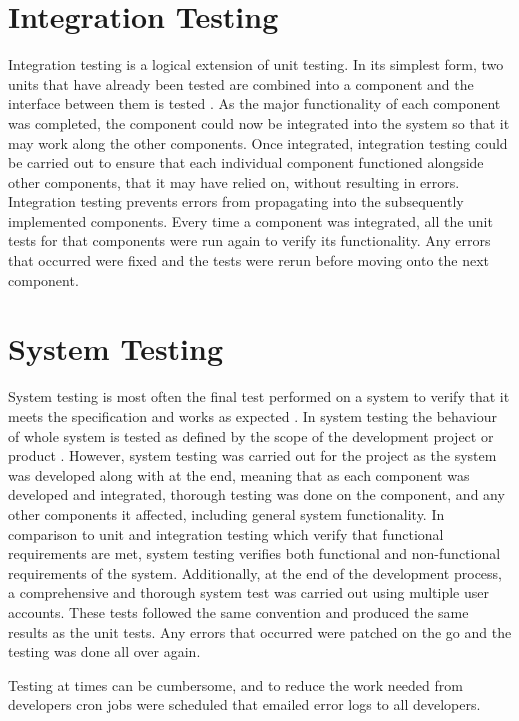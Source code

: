 \section{Integration Testing}
Integration testing is a logical extension of unit testing. In its simplest form, two units that have already been tested are combined into a component and the interface between them is tested \cite{MSDN:IntegrationTesting}. As the major functionality of each component was completed, the component could now be integrated into the system so that it may work along the other components. Once integrated, integration testing could be carried out to ensure that each individual component functioned alongside other components, that it may have relied on, without resulting in errors. Integration testing prevents errors from propagating into the subsequently implemented components. Every time a component was integrated, all the unit tests for that components were run again to verify its functionality. Any errors that occurred were fixed and the tests were rerun before moving onto the next component.

\section{System Testing}
System testing is most often the final test performed on a system to verify that it meets the specification and works as expected \cite{ISTQB:SystemTesting}. In system testing the behaviour of whole system is tested as defined by the scope of the development project or product \cite{ISTQB:SystemTesting}. However, system testing was carried out for the project as the system was developed along with at the end, meaning that as each component was developed and integrated, thorough testing was done on the component, and any other components it affected, including general system functionality. In comparison to unit and integration testing which verify that functional requirements are met, system testing verifies both functional and non-functional requirements of the system. Additionally, at the end of the development process, a comprehensive and thorough system test was carried out using multiple user accounts. These tests followed the same convention and produced the same results as the unit tests. Any errors that occurred were patched on the go and the testing was done all over again.

Testing at times can be cumbersome, and to reduce the work needed from developers cron jobs were scheduled that emailed error logs to all developers. 

